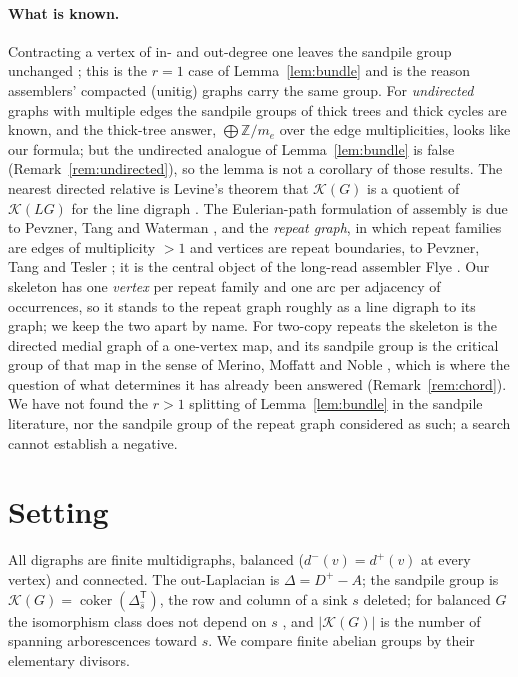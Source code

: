 \documentclass[11pt]{article}
\theoremstyle{plain}
\theoremstyle{definition}
\theoremstyle{remark}
\newcommand{\Z}{\mathbb{Z}}
\newcommand{\K}{\mathcal{K}}
\newcommand{\coker}{\operatorname{coker}}
\begin{document}
\paragraph{What is known.} Contracting a vertex of in- and out-degree one leaves the
sandpile group unchanged \cite[Lem.~4]{Bio1}; this is the $r=1$ case of
Lemma~\ref{lem:bundle} and is the reason assemblers' compacted (unitig) graphs
\cite{BCALM,KM} carry the same group. For \emph{undirected} graphs with multiple edges
the sandpile groups of thick trees \cite{ChenSchedler} and thick cycles \cite{Alar} are
known, and the thick-tree answer, $\bigoplus\Z/m_e$ over the edge multiplicities, looks
like our formula; but the undirected analogue of Lemma~\ref{lem:bundle} is false
(Remark~\ref{rem:undirected}), so the lemma is not a corollary of those results. The
nearest directed relative is Levine's theorem that $\K(G)$ is a quotient of $\K(LG)$ for
the line digraph \cite{Levine,PSX}. The Eulerian-path formulation of assembly is due to
Pevzner, Tang and Waterman \cite{PTW}, and the \emph{repeat graph}, in which repeat
families are edges of multiplicity $>1$ and vertices are repeat boundaries, to Pevzner,
Tang and Tesler \cite{PTT}; it is the central object of the long-read assembler Flye
\cite{Flye}. Our skeleton has one \emph{vertex} per repeat family and one arc per
adjacency of occurrences, so it stands to the repeat graph roughly as a line digraph to
its graph; we keep the two apart by name. For two-copy repeats the skeleton is the
directed medial graph of a one-vertex map, and its sandpile group is the critical group
of that map in the sense of Merino, Moffatt and Noble \cite{MMN}, which is where the
question of what determines it has already been answered (Remark~\ref{rem:chord}). We
have not found the $r>1$ splitting of Lemma~\ref{lem:bundle} in the sandpile literature,
nor the sandpile group of the repeat graph considered as such; a search cannot establish
a negative.

\section{Setting}\label{sec:setting}

All digraphs are finite multidigraphs, balanced ($d^-(v)=d^+(v)$ at every vertex) and
connected. The out-Laplacian is $\Delta=D^+-A$; the sandpile group is
$\K(G)=\coker(\Delta_{\hat s}^{\mathsf T})$, the row and column of a sink $s$ deleted; for
balanced $G$ the isomorphism class does not depend on $s$ \cite[Lem.~4.12]{HLMPPW}, and
$|\K(G)|$ is the number of spanning arborescences toward $s$. We compare finite abelian
groups by their elementary divisors.
\end{document}
